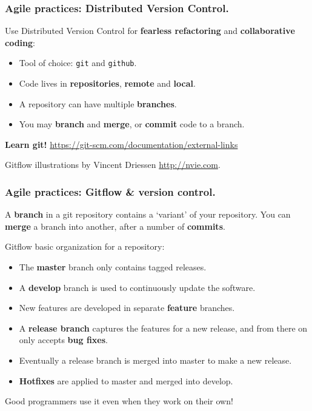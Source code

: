 \documentclass{beamer} %
\newcommand\emc[1]{\textcolor{midred}{\textbf{#1}}}
\begin{document}
\begin{frame}

\frametitle{Agile practices: Distributed Version Control.}

Use Distributed Version Control for \emc{fearless refactoring} and \emc{collaborative coding}:
\begin{itemize}
  \item Tool of choice: \texttt{git} and \texttt{github}.
  \item Code lives in \emc{repositories}, \emc{remote} and \emc{local}.
  \item A repository can have multiple \emc{branches}. 
  \item You may \emc{branch} and \emc{merge}, or \emc{commit} code to a branch.
\end{itemize}

\vspace{5mm}
\emc{Learn git!} \url{https://git-scm.com/documentation/external-links} 

\vspace{5mm}
Gitflow illustrations by Vincent Driessen \url{http://nvie.com}.


\end{frame}


\begin{frame}
\frametitle{Agile practices: Gitflow \& version control.}

A \emc{branch} in a git repository contains a `variant' of your repository. You can \emc{merge} a branch into another, after a number of \emc{commits}.

\vspace{5mm}
Gitflow basic organization for a repository:
\begin{itemize}
  \item The \emc{master} branch only contains tagged releases.
  \item A \emc{develop} branch is used to continuously update the software.
  \item New features are developed in separate \emc{feature} branches.
  \item A \emc{release branch} captures the features for a new release, and from there on only accepts \emc{bug fixes}.
  \item Eventually a release branch is merged into master to make a new release.
  \item \emc{Hotfixes} are applied to master and merged into develop. 
  \end{itemize}

Good programmers use it even when they work on their own!

\end{frame}
\end{document}
